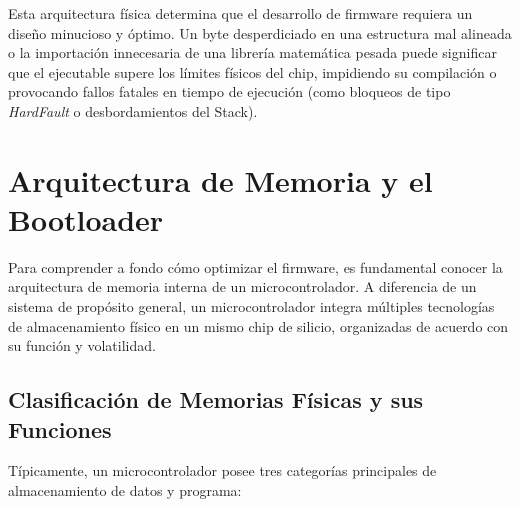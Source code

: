 \documentclass[
10pt, %
a4paper, %
oneside, %
headinclude,footinclude, %
BCOR5mm, %
]{scrartcl}
\begin{document}
Esta arquitectura física determina que el desarrollo de firmware requiera un diseño minucioso y óptimo. Un byte desperdiciado en una estructura mal alineada o la importación innecesaria de una librería matemática pesada puede significar que el ejecutable supere los límites físicos del chip, impidiendo su compilación o provocando fallos fatales en tiempo de ejecución (como bloqueos de tipo \textit{HardFault} o desbordamientos del Stack).

\section{Arquitectura de Memoria y el Bootloader}

Para comprender a fondo cómo optimizar el firmware, es fundamental conocer la arquitectura de memoria interna de un microcontrolador. A diferencia de un sistema de propósito general, un microcontrolador integra múltiples tecnologías de almacenamiento físico en un mismo chip de silicio, organizadas de acuerdo con su función y volatilidad.

\subsection{Clasificación de Memorias Físicas y sus Funciones}

Típicamente, un microcontrolador posee tres categorías principales de almacenamiento de datos y programa:
\end{document}

